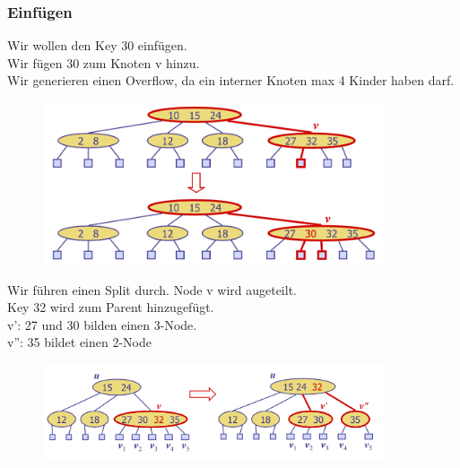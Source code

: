 \documentclass[a4paper,10pt]{report}
\begin{document}
\subsubsection{Einfügen}
Wir wollen den Key 30 einfügen.\\
Wir fügen 30 zum Knoten v hinzu.\\
Wir generieren einen Overflow, da ein interner Knoten max 4 Kinder haben darf.
\begin{figure}[H]
	\begin{center}
  		\includegraphics[width=0.9\textwidth]{img/24treeinsertion1.png}
	\end{center}
\end{figure}
\noindent
Wir führen einen Split durch. Node v wird augeteilt.\\
Key 32 wird zum Parent hinzugefügt.\\
v': 27 und 30 bilden einen 3-Node.\\
v'': 35 bildet einen 2-Node
\begin{figure}[H]
	\begin{center}
  		\includegraphics[width=0.9\textwidth]{img/24treeinsertion2.png}
	\end{center}
\end{figure}
\newpage
\end{document}
